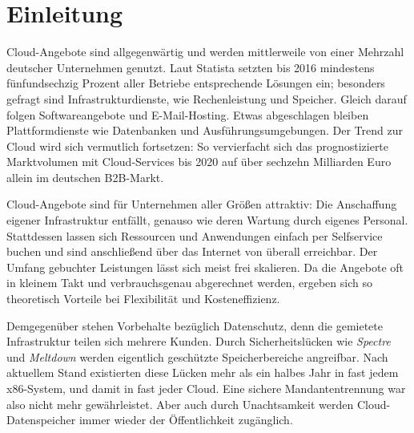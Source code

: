 \chapter{Einleitung}


Cloud-Angebote sind allgegenwärtig und werden mittlerweile von einer Mehrzahl deutscher Unternehmen genutzt. Laut Statista setzten bis 2016 mindestens fünfundsechzig Prozent aller Betriebe entsprechende Lösungen ein;
besonders gefragt sind Infrastrukturdienste, wie Rechenleistung und Speicher. Gleich darauf folgen Softwareangebote und E-Mail-Hosting. Etwas abgeschlagen bleiben Plattformdienste wie Datenbanken und Ausführungsumgebungen. %
Der Trend zur Cloud wird sich vermutlich fortsetzen: So vervierfacht sich das prognostizierte Marktvolumen mit Cloud-Services bis 2020 auf über sechzehn Milliarden Euro allein im deutschen B2B-Markt. %

Cloud-Angebote sind für Unternehmen aller Größen attraktiv: Die Anschaffung eigener Infrastruktur entfällt, genauso wie deren Wartung durch eigenes Personal. Stattdessen lassen sich Ressourcen und Anwendungen einfach per Selfservice buchen und sind anschließend über das Internet von überall erreichbar. Der Umfang gebuchter Leistungen lässt sich meist frei skalieren. Da die Angebote oft in kleinem Takt und verbrauchsgenau abgerechnet werden, ergeben sich so theoretisch Vorteile bei Flexibilität und Kosteneffizienz.

Demgegenüber stehen Vorbehalte bezüglich Datenschutz, denn die gemietete Infrastruktur teilen sich mehrere Kunden. Durch Sicherheitslücken wie \emph{Spectre} und \emph{Meltdown} 
werden eigentlich geschützte Speicherbereiche angreifbar. Nach aktuellem Stand existierten diese Lücken mehr als ein halbes Jahr in fast jedem x86-System, und damit in fast jeder Cloud. Eine sichere Mandantentrennung war also nicht mehr gewährleistet. Aber auch durch Unachtsamkeit werden Cloud-Datenspeicher immer wieder der Öffentlichkeit zugänglich.

